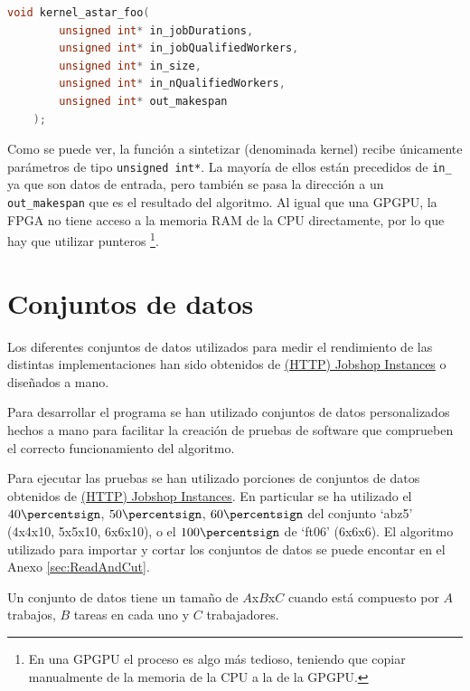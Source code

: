 \begin{lstlisting}[language=C++,caption=Prototipo del kernel a sintetizar.]
    void kernel_astar_foo(
        unsigned int* in_jobDurations,
        unsigned int* in_jobQualifiedWorkers,
        unsigned int* in_size,
        unsigned int* in_nQualifiedWorkers,
        unsigned int* out_makespan
    );
\end{lstlisting}

Como se puede ver, la función a sintetizar (denominada kernel)
recibe únicamente parámetros de tipo \lstinline{unsigned int*}.
La mayoría de ellos están precedidos de \lstinline{in_}
ya que son datos de entrada,
pero también se pasa la dirección a un \lstinline{out_makespan}
que es el resultado del algoritmo.
Al igual que una GPGPU, la FPGA no tiene acceso a la memoria RAM
de la CPU directamente, por lo que hay que utilizar punteros
\footnote{En una GPGPU el proceso es algo más tedioso, teniendo que copiar
manualmente de la memoria de la CPU a la de la GPGPU.}.

\section{Conjuntos de datos}

Los diferentes conjuntos de datos utilizados para medir el rendimiento
de las distintas implementaciones han sido obtenidos de
\href{http://jobshop.jjvh.nl/}{(HTTP) Jobshop Instances}
o diseñados a mano.

Para desarrollar el programa se han utilizado conjuntos de datos
personalizados hechos a mano para facilitar la creación
de pruebas de software que comprueben el correcto funcionamiento
del algoritmo.

Para ejecutar las pruebas se han utilizado porciones de conjuntos
de datos obtenidos de \href{http://jobshop.jjvh.nl/}{(HTTP) Jobshop Instances}.
En particular se ha utilizado el $40\percentsign$, $50\percentsign$, $60\percentsign$ del conjunto
`abz5' (4x4x10, 5x5x10, 6x6x10), o el $100\percentsign$ de `ft06' (6x6x6).
El algoritmo utilizado para importar y cortar
los conjuntos de datos se puede encontar en el Anexo \ref{sec:ReadAndCut}.

\begin{notebox}
    Un conjunto de datos tiene un tamaño de $A$x$B$x$C$ cuando
    está compuesto por $A$ trabajos, $B$ tareas en cada uno y $C$ trabajadores.
\end{notebox}

